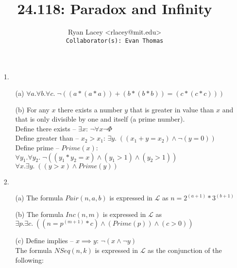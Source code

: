 \documentclass{article}
\begin{document}

\title{24.118: Paradox and Infinity}
\author{
  Ryan Lacey <rlacey@mit.edu>\\
  \footnotesize \texttt{Collaborator(s): Evan Thomas}
}
        
\maketitle
        


\begin{enumerate}
\item[1.]
	\begin{enumerate}
		\item[(a)]
			$\forall a .\forall b .\forall c. \; \neg ((a * (a * a)) + (b * (b * b)) = (c * (c * c)))$\\
		\item[(b)]
			For any $x$ there exists a number $y$ that is greater in value than $x$ and that is only divisible by one and itself (a prime number).\\
			
			Define there exists -- $\exists x$: $\neg \forall x \neg \Phi$\\
			
			Define greater than -- $x_2>x_1$: $\exists y. \; ((x_1 + y = x_2) \land \neg (y = 0))$\\
			
			Define prime -- $Prime(x)$: $\forall y_1. \forall y_2. \; \neg ((y_1 * y_2 = x) \land (y_1 > 1) \land (y_2 > 1))$\\
			
			$\forall x. \exists y. \; ((y > x)  \land Prime(y))$\\
	\end{enumerate}
\item[2.]
	\begin{enumerate}
		\item[(a)]
			The formula $Pair(n,a,b)$ is expressed in $\mathcal{L}$ as  $n = 2^{(a+1)} * 3^{(b+1)}$\\
		\item[(b)]
			The formula $Inc(n,m)$ is expressed in $\mathcal{L}$ as  $\exists p. \exists c. \; ((n = p^{(m+1)}  * c) \land (Prime(p) ) \land (c>0))$\\
		\item[(c)]
			Define implies -- $x \implies y$: $\neg (x \land \neg y)$\\
		
			The formula $NSeq(n,k)$ is expressed in $\mathcal{L}$ as the conjunction of the following:\\
			

\end{enumerate}
\end{enumerate}
\end{document}
